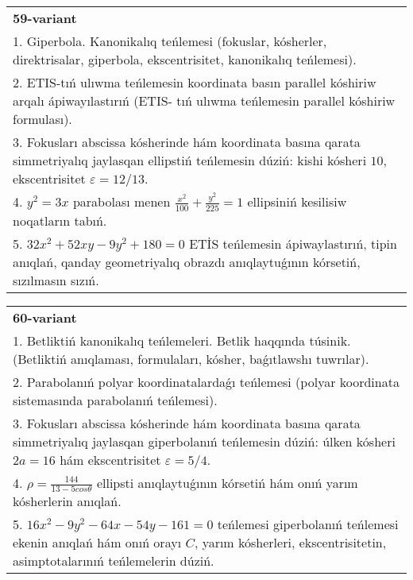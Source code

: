 \documentclass{article}
\begin{document}
\begin{tabular}{m{17cm}}
\textbf{59-variant}\\
1. Giperbola. Kanonikalıq teńlemesi (fokuslar, kósherler, direktrisalar, giperbola, ekscentrisitet, kanonikalıq teńlemesi).\\

2. ETIS-tıń ulıwma teńlemesin koordinata basın parallel kóshiriw arqalı ápiwayılastırıń (ETIS- tıń ulıwma teńlemesin parallel kóshiriw formulası).\\

3. Fokusları abscissa kósherinde hám koordinata basına qarata simmetriyalıq jaylasqan ellipstiń teńlemesin dúziń: kishi kósheri $10$, ekscentrisitet $\varepsilon=12/13$.\\

4. $y^{2} = 3x$ parabolası menen $\frac{x^{2}}{100} + \frac{y^{2}}{225} = 1$ ellipsiniń kesilisiw noqatların tabıń.  \\

5. $32x^{2} + 52xy - 9y^{2} + 180 = 0$ ETİS teńlemesin ápiwaylastırıń, tipin anıqlań, qanday geometriyalıq obrazdı anıqlaytuǵının kórsetiń, sızılmasın sızıń.  
\end{tabular}
\vspace{1cm}


\begin{tabular}{m{17cm}}
\textbf{60-variant}\\
1. Betliktiń kanonikalıq teńlemeleri. Betlik haqqında túsinik. (Betliktiń anıqlaması, formulaları, kósher, baǵıtlawshı tuwrılar).\\

2. Parabolanıń polyar koordinatalardaǵı teńlemesi (polyar koordinata sistemasında parabolanıń teńlemesi).\\

3. Fokusları abscissa kósherinde hám koordinata basına qarata simmetriyalıq jaylasqan giperbolanıń teńlemesin dúziń: úlken kósheri $2 a=16$ hám ekscentrisitet $\varepsilon=5/4$.\\

4. $\rho = \frac{144}{13 - 5cos\theta}$ ellipsti anıqlaytuǵının kórsetiń hám onıń yarım kósherlerin anıqlań.\\

5. $16x^{2} - 9y^{2} - 64x - 54y - 161 = 0$ teńlemesi giperbolanıń teńlemesi ekenin anıqlań hám onıń orayı $C$, yarım kósherleri, ekscentrisitetin, asimptotalarınıń teńlemelerin dúziń.  
\end{tabular}
\vspace{1cm}
\end{document}
